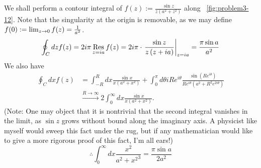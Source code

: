 \item

We shall perform a contour integral of $f(z) := \frac{\sin z}{z \left( a^2 + z^2 \right)}$ along ~\ref{fig:problem3-12}.
Note that the singularity at the origin is removable, as we may define
$f(0) := \lim_{z\rightarrow 0} f(z) = \frac{1}{a^2}$.
\[
	\oint_C dz f(z)
	= 2i\pi \mathop{\mathrm{Res}}_{z = ia} f(z)
	= 2i\pi \cdot {\left. \frac{\sin z}{z \left( z + ia \right)} \right|}_{z = ia}
	= \frac{\pi \sin a}{a^2}
\]
We also have
\begin{align*}
	\oint_C dx f(z)
    &= \int_{-R}^{R} dx \frac{\sin x}{x \left( a^2 + x^2 \right)}
     + \int_0^{\pi} d\theta iRe^{i\theta} \frac{\sin\left( Re^{i\theta} \right)}{Re^{i\theta} \left( a^2 + R^2 e^{2i\theta} \right)}     \\
    &\xrightarrow{R \rightarrow \infty} 2\int_0^\infty dx \frac{\sin x}{x \left( a^2 + x^2 \right)}.
\end{align*}
(Note: One may object that it is nontrivial that the second integral vanishes in the limit,
as $\sin z$ grows without bound along the imaginary axis.
A physicist like myself would sweep this fact under the rug,
but if any mathematician would like to give a more rigorous proof of this fact, I'm all ears!)
\[
	\therefore \int_0^\infty dx \frac{x^2}{{a^2 + x^2}^3} = \frac{\pi \sin a}{2a^2}
\]